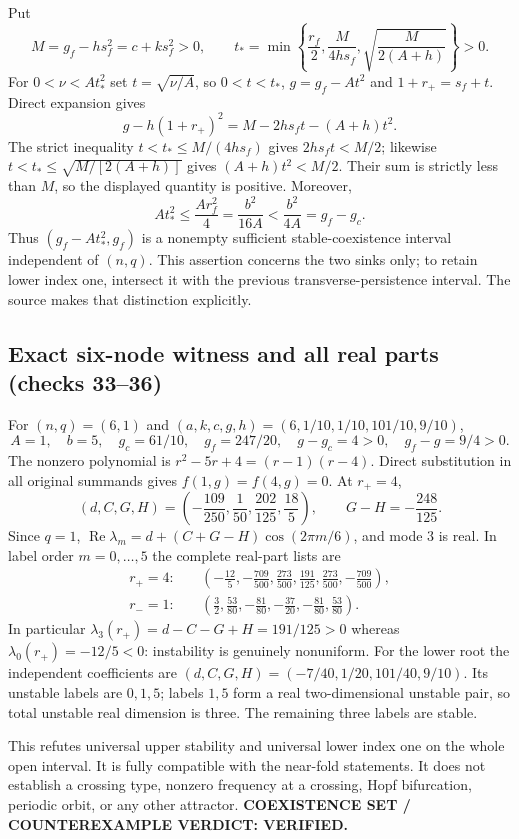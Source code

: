 \documentclass[11pt]{article}
\newcommand{\Ree}{\operatorname{Re}}
\begin{document}
Put
\[
 M=g_f-hs_f^2=c+ks_f^2>0,\qquad
 t_* =\min\left\{\frac{r_f}{2},\frac{M}{4hs_f},
                  \sqrt{\frac{M}{2(A+h)}}\right\}>0.
\]
For $0<\nu<At_*^2$ set $t=\sqrt{\nu/A}$, so $0<t<t_*$,
$g=g_f-At^2$ and $1+r_+=s_f+t$. Direct expansion gives
\[
 g-h(1+r_+)^2=M-2hs_ft-(A+h)t^2.
\]
The strict inequality $t<t_*\le M/(4hs_f)$ gives
$2hs_ft<M/2$; likewise $t<t_*\le\sqrt{M/[2(A+h)]}$ gives
$(A+h)t^2<M/2$. Their sum is strictly less than $M$, so the displayed
quantity is positive. Moreover,
\[
 At_*^2\le\frac{A r_f^2}{4}=\frac{b^2}{16A}
             <\frac{b^2}{4A}=g_f-g_c.
\]
Thus $(g_f-At_*^2,g_f)$ is a nonempty sufficient stable-coexistence interval
independent of $(n,q)$. This assertion concerns the two sinks only; to
retain lower index one, intersect it with the previous transverse-persistence
interval. The source makes that distinction explicitly.

\subsection{Exact six-node witness and all real parts (checks 33--36)}
For $(n,q)=(6,1)$ and
$(a,k,c,g,h)=(6,1/10,1/10,101/10,9/10)$,
\[
 A=1,\quad b=5,\quad g_c=61/10,\quad g_f=247/20,
 \quad g-g_c=4>0,\quad g_f-g=9/4>0.
\]
The nonzero polynomial is $r^2-5r+4=(r-1)(r-4)$. Direct substitution in
all original summands gives $f(1,g)=f(4,g)=0$. At $r_+=4$,
\[
 (d,C,G,H)=\left(-\frac{109}{250},\frac1{50},
                  \frac{202}{125},\frac{18}{5}\right),\qquad
 G-H=-\frac{248}{125}.
\]
Since $q=1$, $\Ree\lambda_m=d+(C+G-H)\cos(2\pi m/6)$, and mode $3$
is real. In label order $m=0,\ldots,5$ the complete real-part lists are
\begin{align*}
 r_+=4:&\quad
 \left(-\frac{12}{5},-\frac{709}{500},\frac{273}{500},
           \frac{191}{125},\frac{273}{500},-\frac{709}{500}\right),\\
 r_-=1:&\quad
 \left(\frac32,\frac{53}{80},-\frac{81}{80},
          -\frac{37}{20},-\frac{81}{80},\frac{53}{80}\right).
\end{align*}
In particular $\lambda_3(r_+)=d-C-G+H=191/125>0$ whereas
$\lambda_0(r_+)=-12/5<0$: instability is genuinely nonuniform.
For the lower root the independent coefficients are
$(d,C,G,H)=(-7/40,1/20,101/40,9/10)$. Its unstable labels are $0,1,5$;
labels $1,5$ form a real two-dimensional unstable pair, so total unstable
real dimension is three. The remaining three labels are stable.

This refutes universal upper stability and universal lower index one on the
whole open interval. It is fully compatible with the near-fold statements.
It does not establish a crossing type, nonzero frequency at a crossing,
Hopf bifurcation, periodic orbit, or any other attractor.
\textbf{COEXISTENCE SET / COUNTEREXAMPLE VERDICT: VERIFIED.}
\end{document}
